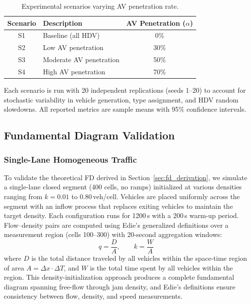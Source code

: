 \documentclass[review,authoryear]{elsarticle}
\begin{document}
\begin{table}[ht]
\centering
\caption{Experimental scenarios varying AV penetration rate.}
\label{tab:scenarios}
\begin{tabular}{@{}clc@{}}
\toprule
Scenario & Description & AV Penetration ($\alpha$) \\
\midrule
S1 & Baseline (all HDV) & 0\% \\
S2 & Low AV penetration & 30\% \\
S3 & Moderate AV penetration & 50\% \\
S4 & High AV penetration & 70\% \\
\bottomrule
\end{tabular}
\end{table}

Each scenario is run with 20 independent replications (seeds 1--20) to account for stochastic variability in vehicle generation, type assignment, and HDV random slowdowns. All reported metrics are sample means with 95\% confidence intervals.


\subsection{Fundamental Diagram Validation}
\label{sec:exp_fd}

\subsubsection{Single-Lane Homogeneous Traffic}

To validate the theoretical FD derived in Section~\ref{sec:fd_derivation}, we simulate a single-lane closed segment (400 cells, no ramps) initialized at various densities ranging from $k = 0.01$ to $0.80$\,veh/cell. Vehicles are placed uniformly across the segment with an inflow process that replaces exiting vehicles to maintain the target density. Each configuration runs for 1200\,s with a 200\,s warm-up period. Flow--density pairs are computed using Edie's generalized definitions \citep{edie1963discussion} over a measurement region (cells 100--300) with 20-second aggregation windows:
\begin{equation}
    q = \frac{D}{A}, \qquad k = \frac{W}{A}
    \label{eq:fd_measurement}
\end{equation}
where $D$ is the total distance traveled by all vehicles within the space-time region of area $A = \Delta x \cdot \Delta T$, and $W$ is the total time spent by all vehicles within the region. This density-initialization approach produces a complete fundamental diagram spanning free-flow through jam density, and Edie's definitions ensure consistency between flow, density, and speed measurements.
\end{document}
